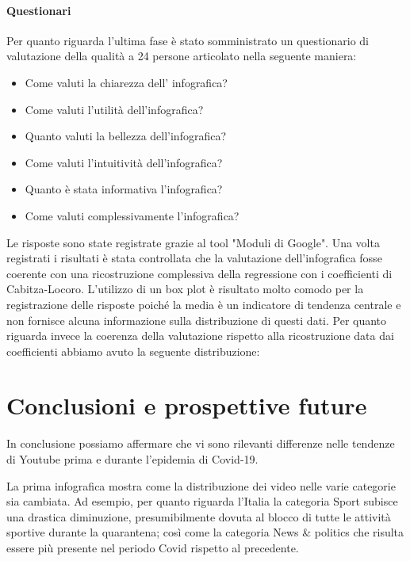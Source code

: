 \documentclass[10pt, a4paper,openany]{article}
\begin{document}
\paragraph{Questionari} Per quanto riguarda l'ultima fase è stato somministrato un questionario di valutazione della qualità a 24 persone articolato nella seguente maniera:
\begin{itemize}
	\item Come valuti la chiarezza dell' infografica?
	\item Come valuti l'utilità dell'infografica?
	\item Quanto valuti la bellezza dell'infografica?
	\item Come valuti l'intuitività dell'infografica?
	\item Quanto è stata informativa l'infografica?
	\item Come valuti complessivamente l'infografica?
\end{itemize}
Le risposte sono state registrate grazie al tool "Moduli di Google". Una volta registrati i risultati è stata controllata che la valutazione dell'infografica fosse coerente con una ricostruzione complessiva della regressione con i coefficienti di Cabitza-Locoro.
L'utilizzo di un box plot è risultato molto comodo per la registrazione delle risposte poiché la media è un indicatore di tendenza centrale e non fornisce alcuna informazione sulla distribuzione di questi dati.
Per quanto riguarda invece la coerenza della valutazione rispetto alla ricostruzione data dai coefficienti abbiamo avuto la seguente distribuzione:

\section*{Conclusioni e prospettive future}
In conclusione possiamo affermare che vi sono rilevanti differenze nelle tendenze di Youtube prima e durante l'epidemia di Covid-19. 

La prima infografica mostra come la distribuzione dei video nelle varie categorie sia cambiata. Ad esempio, per quanto riguarda l'Italia la categoria Sport subisce una drastica diminuzione, presumibilmente dovuta al blocco di tutte le attività sportive durante la quarantena; così come la categoria News \& politics che risulta essere più presente nel periodo Covid rispetto al precedente.
\end{document}
